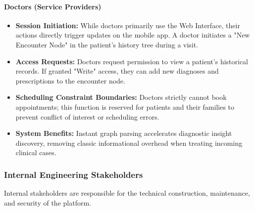 \paragraph{Doctors (Service Providers)}
\begin{itemize}
    \item \textbf{Session Initiation:} While doctors primarily use the Web Interface, their actions directly trigger updates on the mobile app. A doctor initiates a "New Encounter Node" in the patient's history tree during a visit.
    \item \textbf{Access Requests:} Doctors request permission to view a patient's historical records. If granted "Write" access, they can add new diagnoses and prescriptions to the encounter node.
    \item \textbf{Scheduling Constraint Boundaries:} Doctors strictly cannot book appointments; this function is reserved for patients and their families to prevent conflict of interest or scheduling errors.
    \item \textbf{System Benefits:} Instant graph parsing accelerates diagnostic insight discovery, removing classic informational overhead when treating incoming clinical cases.
\end{itemize}

\subsubsection{Internal Engineering Stakeholders}
Internal stakeholders are responsible for the technical construction, maintenance, and security of the platform.
